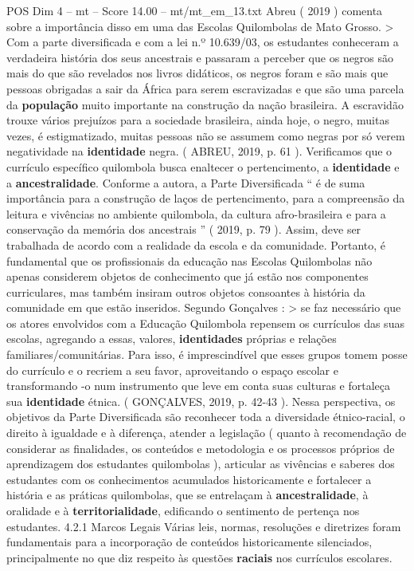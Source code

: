 \begin{textsample}{POS Dim 4 – mt – Score 14.00 – mt/mt\_em\_13.txt}
Abreu ( 2019 ) comenta sobre a importância disso em uma das Escolas Quilombolas de Mato Grosso. > Com a parte diversificada e com a lei n.º 10.639/03, os estudantes conheceram a verdadeira história dos seus ancestrais e passaram a perceber que os negros são mais do que são revelados nos livros didáticos, os negros foram e são mais que pessoas obrigadas a sair da África para serem escravizadas e que são uma parcela da \textbf{população} muito importante na construção da nação brasileira.
A escravidão trouxe vários prejuízos para a sociedade brasileira, ainda hoje, o negro, muitas vezes, é estigmatizado, muitas pessoas não se assumem como negras por só verem negatividade na \textbf{identidade} negra. ( ABREU, 2019, p. 61 ).
Verificamos que o currículo específico quilombola busca enaltecer o pertencimento, a \textbf{identidade} e a \textbf{ancestralidade}.
Conforme a autora, a Parte Diversificada “ é de suma importância para a construção de laços de pertencimento, para a compreensão da leitura e vivências no ambiente quilombola, da cultura afro-brasileira e para a conservação da memória dos ancestrais ” ( 2019, p. 79 ).
Assim, deve ser trabalhada de acordo com a realidade da escola e da comunidade.
Portanto, é fundamental que os profissionais da educação nas Escolas Quilombolas não apenas considerem objetos de conhecimento que já estão nos componentes curriculares, mas também insiram outros objetos consoantes à história da comunidade em que estão inseridos.
Segundo Gonçalves : > se faz necessário que os atores envolvidos com a Educação Quilombola repensem os currículos das suas escolas, agregando a essas, valores, \textbf{identidades} próprias e relações familiares/comunitárias.
Para isso, é imprescindível que esses grupos tomem posse do currículo e o recriem a seu favor, aproveitando o espaço escolar e transformando -o num instrumento que leve em conta suas culturas e fortaleça sua \textbf{identidade} étnica. ( GONÇALVES, 2019, p. 42-43 ).
Nessa perspectiva, os objetivos da Parte Diversificada são reconhecer toda a diversidade étnico-racial, o direito à igualdade e à diferença, atender a legislação ( quanto à recomendação de considerar as finalidades, os conteúdos e metodologia e os processos próprios de aprendizagem dos estudantes quilombolas ), articular as vivências e saberes dos estudantes com os conhecimentos acumulados historicamente e fortalecer a história e as práticas quilombolas, que se entrelaçam à \textbf{ancestralidade}, à oralidade e à \textbf{territorialidade}, edificando o sentimento de pertença nos estudantes. 4.2.1 Marcos Legais Várias leis, normas, resoluções e diretrizes foram fundamentais para a incorporação de conteúdos historicamente silenciados, principalmente no que diz respeito às questões \textbf{raciais} nos currículos escolares.

\end{textsample}
